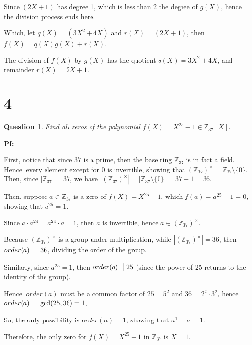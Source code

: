 \documentclass{article}
\newtheorem{question}{Question}
\begin{document}
\hfill

\hfill

Since $(2X+1)$ has degree 1, which is less than 2 the degree of $g(X)$, hence the division process ends here.

Which, let $q(X)=(3X^2+4X)$ and $r(X)=(2X+1)$, then $f(X)=q(X)g(X)+r(X)$.

The division of $f(X)$ by $g(X)$ has the quotient $q(X)=3X^2+4X$, and remainder $r(X)=2X+1$.

\break

\section*{4}
\begin{myBox}[]{}
    \begin{question}
        Find all zeros of the polynomial $f(X)=X^{25}-1 \in \mathbb{Z}_{37}[X]$.
    \end{question}
\end{myBox}

\textbf{Pf:}

First, notice that since $37$ is a prime, then the base ring $\mathbb{Z}_{37}$ is in fact a field.
Hence, every element except for $0$ is invertible, showing that $(\mathbb{Z}_{37})^\times = \mathbb{Z}_{37}\setminus\{0\}$.
Then, since $|\mathbb{Z}_{37}| = 37$, we have $|(\mathbb{Z}_{37})^\times| = |\mathbb{Z}_{37}\setminus\{0\}| = 37-1 = 36$.

\hfill

Then, suppose $a\in\mathbb{Z}_{37}$ is a zero of $f(X)=X^{25}-1$, which $f(a)=a^{25}-1 = 0$, showing that $a^{25}=1$.

Since $a\cdot a^{24} = a^{24}\cdot a=1$, then $a$ is invertible, hence $a\in(\mathbb{Z}_{37})^\times$.

Because $(\mathbb{Z}_{37})^\times$ is a group under multiplication, while $|(\mathbb{Z}_{37})^\times| = 36$, then $order(a)\ \bigm |\ 36$, 
dividing the order of the group.

Similarly, since $a^{25}=1$, then $order(a)\ \bigm | 25$ (since the power of 25 returns to the identity of the group).

Hence, $order(a)$ must be a common factor of $25 = 5^2$ and $36 = 2^2\cdot 3^2$, hence $order(a)\ \bigm |\ \gcd(25,36)=1$.

\hfill

So, the only possibility is $order(a)=1$, showing that $a^1=a=1$.

Therefore, the only zero for $f(X)=X^{25}-1$ in $\mathbb{Z}_{37}$ is $X=1$.
\end{document}
